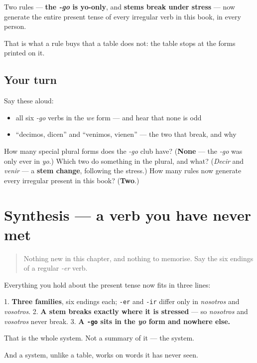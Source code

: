 \begin{grammarlens}[title={What you've built}]
Two rules — \textbf{the \emph{-go} is yo-only}, and \textbf{stems break under stress} — now generate the entire present tense of every irregular verb in this book, in every person.

That is what a rule buys that a table does not: the table stops at the forms printed on it.
\end{grammarlens}

\subsection*{Your turn}
Say these aloud:

\begin{itemize}
\raggedright
  \item all six \emph{-go} verbs in the \emph{we} form — and hear that none is odd
  \item \textquotedblleft{}decimos, dicen\textquotedblright{} and \textquotedblleft{}venimos, vienen\textquotedblright{} — the two that break, and why
\end{itemize}

\begin{tcolorbox}[breakable,colback=teal!4,colframe=teal!35!black,title={Before you move on}]
How many special plural forms does the \emph{-go} club have? (\textbf{None} — the \emph{-go} was only ever in \emph{yo}.) Which two do something in the plural, and what? (\emph{Decir} and \emph{venir} — a \textbf{stem change}, following the stress.) How many rules now generate every irregular present in this book? (\textbf{Two}.)
\end{tcolorbox}
\section[Practice]{Synthesis — a verb you have never met}

\label{lesson:ES-C13-sintesis-derivar}



\begin{quote}
Nothing new in this chapter, and nothing to memorise. Say the six endings of a regular \emph{-er} verb.
\end{quote}

\begin{grammarlens}[title={What you've built}]
Everything you hold about the present tense now fits in three lines:

1. \textbf{Three families}, six endings each; \texttt{-er} and \texttt{-ir} differ only in \emph{nosotros} and \emph{vosotros}. 2. \textbf{A stem breaks exactly where it is stressed} — so \emph{nosotros} and \emph{vosotros} never break. 3. \textbf{A \texttt{-go} sits in the \emph{yo} form and nowhere else.}

That is the whole system. Not a summary of it — the system.

And a system, unlike a table, works on words it has never seen.
\end{grammarlens}

